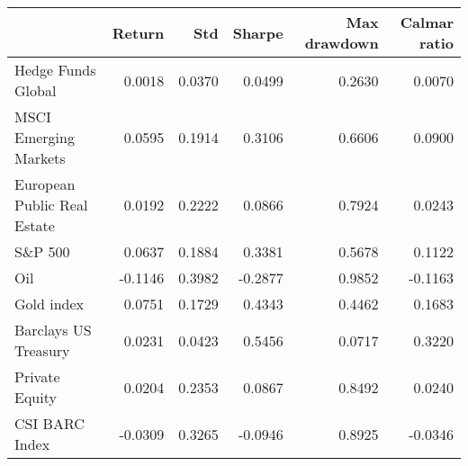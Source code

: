 \begin{tabular}{lrrrrr}
\toprule
{} &  Return &     Std &  Sharpe &  Max drawdown &  Calmar ratio \\
\midrule
Hedge Funds Global          &  0.0018 &  0.0370 &  0.0499 &        0.2630 &        0.0070 \\
MSCI Emerging Markets       &  0.0595 &  0.1914 &  0.3106 &        0.6606 &        0.0900 \\
European Public Real Estate &  0.0192 &  0.2222 &  0.0866 &        0.7924 &        0.0243 \\
S\&P 500                     &  0.0637 &  0.1884 &  0.3381 &        0.5678 &        0.1122 \\
Oil                         & -0.1146 &  0.3982 & -0.2877 &        0.9852 &       -0.1163 \\
Gold index                  &  0.0751 &  0.1729 &  0.4343 &        0.4462 &        0.1683 \\
Barclays US Treasury        &  0.0231 &  0.0423 &  0.5456 &        0.0717 &        0.3220 \\
Private Equity              &  0.0204 &  0.2353 &  0.0867 &        0.8492 &        0.0240 \\
CSI BARC Index              & -0.0309 &  0.3265 & -0.0946 &        0.8925 &       -0.0346 \\
\bottomrule
\end{tabular}
